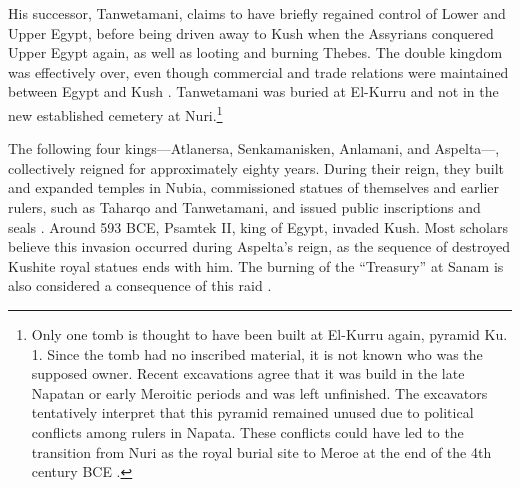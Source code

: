 His successor, Tanwetamani, claims to have briefly regained control of Lower and Upper Egypt, before being driven away to Kush when the Assyrians conquered Upper Egypt again, as well as looting and burning Thebes. The double kingdom was effectively over, even though commercial and trade relations were maintained between Egypt and Kush \parencite[p.~356-360]{törökTwoWorldsFrontier2009}. Tanwetamani was buried at El-Kurru and  not in the new established cemetery at Nuri.\footnote{Only one tomb is thought to have been built at El-Kurru again, pyramid Ku. 1. Since the tomb had no inscribed material, it is not known who was the supposed owner. Recent excavations agree that it was build in the late Napatan or early Meroitic periods and was left unfinished. The excavators tentatively interpret that this pyramid remained unused due to political conflicts among rulers in Napata. These conflicts could have led to the transition from Nuri as the royal burial site to Meroe at the end of the 4th century BCE \parencites[p.~62]{emberlingExcavationPyramidKu2015}{yellinPyramidChapelDecorations2015}.}


The following four kings---Atlanersa, Senkamanisken, Anlamani, and Aspelta---, collectively reigned for approximately eighty years. During their reign, they built and expanded temples in Nubia, commissioned statues of themselves and earlier rulers, such as Taharqo and Tanwetamani, and issued public inscriptions and seals \parencites[p.~157-163]{rillyHistoireSoudanOrigines2017}[p.~133-137]{emberlingKushDynastyNapata2023}. Around 593 BCE, Psamtek II, king of Egypt, invaded Kush. Most scholars believe this invasion occurred during Aspelta's reign, as the sequence of destroyed Kushite royal statues ends with him. The burning of the “Treasury” at Sanam is also considered a consequence of this raid \parencites[p.~361-362]{törökTwoWorldsFrontier2009}{andersonWhatAreThese2009}[p.~138-139]{emberlingKushDynastyNapata2023}.


